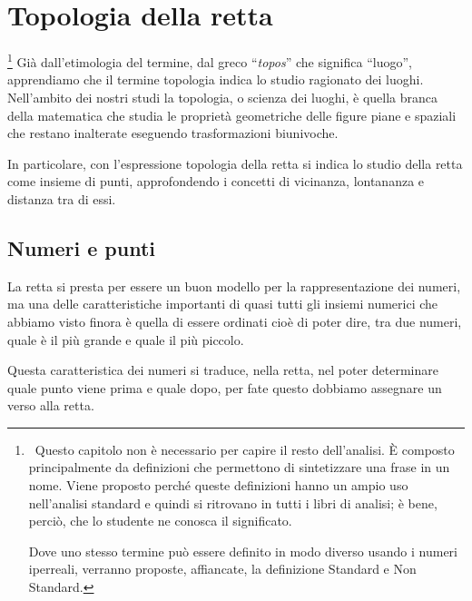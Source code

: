 


\chapter{Topologia della retta}

\footnote{~Questo capitolo non è necessario per capire il resto 
dell'analisi.
È composto principalmente da definizioni che permettono di sintetizzare una 
frase in un nome.
Viene proposto perché queste definizioni hanno un ampio uso nell'analisi 
standard e quindi si ritrovano in tutti i libri di analisi; 
è bene, perciò, che lo studente ne conosca il significato.

Dove uno stesso termine può essere definito in modo diverso 
usando i numeri iperreali, verranno proposte, affiancate, la definizione 
Standard e Non Standard.}
Già dall'etimologia del termine, dal greco ``\emph{topos}'' che significa 
``luogo'', apprendiamo che il termine topologia indica lo studio 
ragionato dei luoghi. 
Nell'ambito dei nostri studi la topologia, o scienza dei luoghi, 
è quella branca della matematica che studia le proprietà geometriche 
delle figure piane e spaziali che restano inalterate eseguendo 
trasformazioni biunivoche. 

In particolare, con l'espressione topologia della retta si indica 
lo studio della retta come insieme di punti, approfondendo i concetti di 
vicinanza, lontananza e distanza tra di essi.

\section{Numeri e punti}
\label{sec:topologianumeripunti}

La retta si presta per essere un buon modello per la rappresentazione dei 
numeri, ma una delle caratteristiche importanti di quasi tutti gli insiemi 
numerici che abbiamo visto finora è quella di essere ordinati cioè di poter 
dire, tra due numeri, quale è il più grande e quale il più piccolo.

Questa caratteristica dei numeri si traduce, nella retta, nel poter 
determinare quale punto viene prima e quale dopo, 
per fate questo dobbiamo assegnare un verso alla retta.


